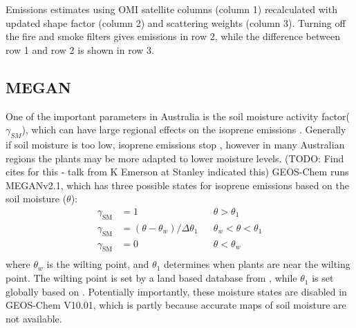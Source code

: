     {Emissions estimates using OMI satellite columns (column 1) recalculated with updated shape factor (column 2) and scattering weights (column 3). Turning off the fire and smoke filters gives emissions in row 2, while the difference between row 1 and row 2 is shown in row 3.}
    {\label{BioIsop:Uncertainty:Fire:fig_emiss_without_fire_filter}}
    
  
  \subsection{MEGAN}

    One of the important parameters in Australia is the soil moisture activity factor($\gamma_{SM}$), which can have large regional effects on the isoprene emissions \parencite{Sindelarova2014,Bauwens2016}.
    Generally if soil moisture is too low, isoprene emissions stop \parencite{Pegoraro2004,Niinemets2010}, however in many Australian regions the plants may be more adapted to lower moisture levels. (TODO: Find cites for this - talk from K Emerson at Stanley indicated this)
    GEOS-Chem runs MEGANv2.1, which has three possible states for isoprene emissions based on the soil moisture ($\theta$):
    \begin{align*}
    \gamma_\mathrm{SM} & = 1 && \theta > \theta_1 \\
    \gamma_\mathrm{SM} & = (\theta-\theta_w)/\Delta\theta_1  && \theta_w < \theta < \theta_1 \\
    \gamma_\mathrm{SM} & = 0 && \theta < \theta_w \\
    \end{align*}
    where $\theta_w$ is the wilting point, and $\theta_1$ determines when plants are near the wilting point.
    The wilting point is set by a land based database from \textcite{Chen2001}, while $\theta_1$ is set globally based on \textcite{Pegoraro2004}.
    Potentially importantly, these moisture states are disabled in GEOS-Chem V10.01, which is partly because accurate maps of soil moisture are not available.
  
%  
  